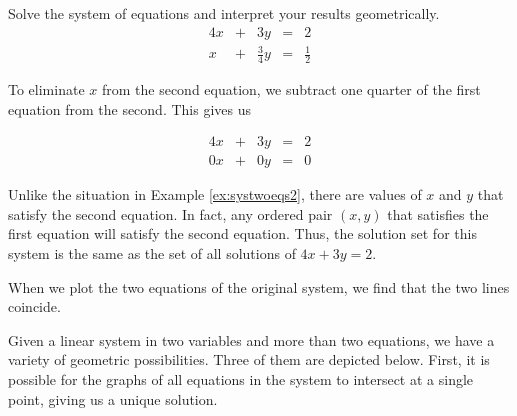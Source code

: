 \documentclass{ximera}
\begin{document}
\begin{example}\label{ex:systwoeqs3infmany} Solve the system of equations and interpret your results geometrically.
$$\begin{array}{ccccc}
      4x & +&3y&= &2 \\
	 x& +&\frac{3}{4}y&=&\frac{1}{2}
    \end{array}$$

\begin{explanation}
To eliminate $x$ from the second equation, we subtract one quarter of the first equation from the second.  This gives us

$$\begin{array}{ccccc}
      4x & +&3y&= &2 \\
	 0x& +&0y&=&0
    \end{array}$$
    
Unlike the situation in Example \ref{ex:systwoeqs2}, there are values of $x$ and $y$ that satisfy the second equation.  In fact, any ordered pair $(x, y)$ that satisfies the first equation will satisfy the second equation.  Thus, the solution set for this system is the same as the set of all solutions of $4x+3y=2$.  

When we plot the two equations of the original system, we find that the two lines coincide.


    \begin{center}
\end{center}
\end{explanation}
\end{example}

Given a linear system in two variables and more than two equations, we have a variety of geometric possibilities.  Three of them are depicted below.  First, it is possible for the graphs of all equations in the system to intersect at a single point, giving us a unique solution.  

\begin{center}
\end{center}
\end{document}
